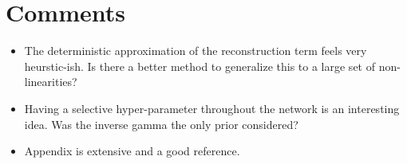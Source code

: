 \section{Comments}

\begin{itemize}
	\item The deterministic approximation of the reconstruction term feels very heurstic-ish. Is there a better method to generalize this to a large set of non-linearities?
	\item Having a selective hyper-parameter throughout the network is an interesting idea. Was the inverse gamma the only prior considered?
	\item Appendix is extensive and a good reference.
\end{itemize}

